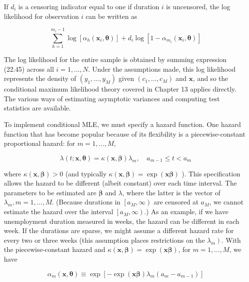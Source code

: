 \documentclass[10pt]{article}
\begin{document}
If $d_{i}$ is a censoring indicator equal to one if duration $i$ is uncensored, the log likelihood for observation $i$ can be written as


\begin{equation*}
\sum_{h=1}^{m_{i}-1} \log \left[\alpha_{h}\left(\mathbf{x}_{i}, \boldsymbol{\theta}\right)\right]+d_{i} \log \left[1-\alpha_{m_{i}}\left(\mathbf{x}_{i}, \boldsymbol{\theta}\right)\right] \tag{22.45}
\end{equation*}


The log likelihood for the entire sample is obtained by summing expression (22.45) across all $i=1, \ldots, N$. Under the assumptions made, this log likelihood represents the density of $\left(y_{1}, \ldots, y_{M}\right)$ given $\left(c_{1}, \ldots, c_{M}\right)$ and $\mathbf{x}$, and so the conditional maximum likelihood theory covered in Chapter 13 applies directly. The various ways of estimating asymptotic variances and computing test statistics are available.

To implement conditional MLE, we must specify a hazard function. One hazard function that has become popular because of its flexibility is a piecewise-constant proportional hazard: for $m=1, \ldots, M$,


\begin{equation*}
\lambda(t ; \mathbf{x}, \boldsymbol{\theta})=\kappa(\mathbf{x}, \boldsymbol{\beta}) \lambda_{m}, \quad a_{m-1} \leq t<a_{m} \tag{22.46}
\end{equation*}


where $\kappa(\mathbf{x}, \boldsymbol{\beta})>0$ (and typically $\kappa(\mathbf{x}, \boldsymbol{\beta})=\exp (\mathbf{x} \boldsymbol{\beta})$ ). This specification allows the hazard to be different (albeit constant) over each time interval. The parameters to be estimated are $\boldsymbol{\beta}$ and $\lambda$, where the latter is the vector of $\lambda_{m}, m=1, \ldots, M$. (Because durations in $\left[a_{M}, \infty\right)$ are censored at $a_{M}$, we cannot estimate the hazard over the interval $\left[a_{M}, \infty\right)$.) As an example, if we have unemployment duration measured in weeks, the hazard can be different in each week. If the durations are sparse, we might assume a different hazard rate for every two or three weeks (this assumption places restrictions on the $\left.\lambda_{m}\right)$. With the piecewise-constant hazard and $\kappa(\mathbf{x}, \boldsymbol{\beta})=\exp (\mathbf{x} \boldsymbol{\beta})$, for $m=1, \ldots, M$, we have


\begin{equation*}
\alpha_{m}(\mathbf{x}, \boldsymbol{\theta}) \equiv \exp \left[-\exp (\mathbf{x} \boldsymbol{\beta}) \lambda_{m}\left(a_{m}-a_{m-1}\right)\right] \tag{22.47}
\end{equation*}
\end{document}
